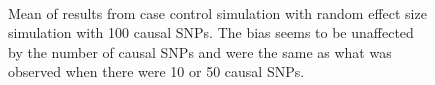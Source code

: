 \begin{figure}
{				\label{fig:gctaCCRandMean}
			}\\
			\caption[Mean of Case Control Simulation Results (100 Causal)]
			{Mean of results from case control simulation with random effect size simulation with 100 causal \glspl{SNP}.
				The bias seems to be unaffected by the number of causal \glspl{SNP} and were the same as what was observed when there were 10 or 50 causal \glspl{SNP}.
				} 
			\label{fig:CCRandMean}
		\end{figure}
		
